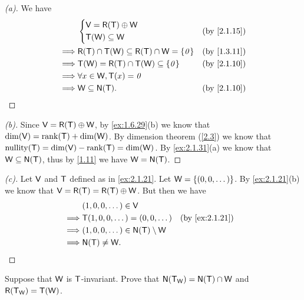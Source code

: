 \begin{proof}[(a)]
  We have
  \begin{align*}
             & \begin{dcases}
                 \V = \rg{\T} \oplus \W \\
                 \T(\W) \subseteq \W
               \end{dcases}                                 &  & \by{2.1.15}              \\
    \implies & \rg{\T} \cap \T(\W) \subseteq \rg{\T} \cap \W = \set{\zv} &  & \by{1.3.11} \\
    \implies & \T(\W) = \rg{\T} \cap \T(\W) \subseteq \set{\zv}          &  & \by{2.1.10} \\
    \implies & \forall x \in \W, \T(x) = \zv                                              \\
    \implies & \W \subseteq \ns{\T}.                                     &  & \by{2.1.10}
  \end{align*}
\end{proof}

\begin{proof}[(b)]
  Since \(\V = \rg{\T} \oplus \W\), by \cref{ex:1.6.29}(b) we know that \(\dim(\V) = \rk{\T} + \dim(\W)\).
  By dimension theorem (\cref{2.3}) we know that \(\nt{\T} = \dim(\V) - \rk{\T} = \dim(\W)\).
  By \cref{ex:2.1.31}(a) we know that \(\W \subseteq \ns{\T}\), thus by \cref{1.11} we have \(\W = \ns{\T}\).
\end{proof}

\begin{proof}[(c)]
  Let \(\mathsf{V}\) and \(\mathsf{T}\) defined as in \cref{ex:2.1.21}.
  Let \(\mathsf{W} = \left\lbrace(0, 0, \dots)\right\rbrace\).
  By \cref{ex:2.1.21}(b) we know that \(\V = \rg{\T} = \rg{\T} \oplus \W\).
  But then we have
  \begin{align*}
             & (1, 0, 0, \dots) \in \V                                       \\
    \implies & \T(1, 0, 0, \dots) = (0, 0, \dots)        &  & \by{ex:2.1.21} \\
    \implies & (1, 0, 0, \dots) \in \ns{\T} \setminus \W                     \\
    \implies & \ns{\T} \neq \W.
  \end{align*}
\end{proof}

\begin{ex}\label{ex:2.1.32}
  Suppose that \(\mathsf{W}\) is \(\mathsf{T}\)-invariant.
  Prove that \(\ns{\T_{\W}} = \ns{\T} \cap \W\) and \(\rg{\T_{\W}} = \T(\W)\).
\end{ex}

